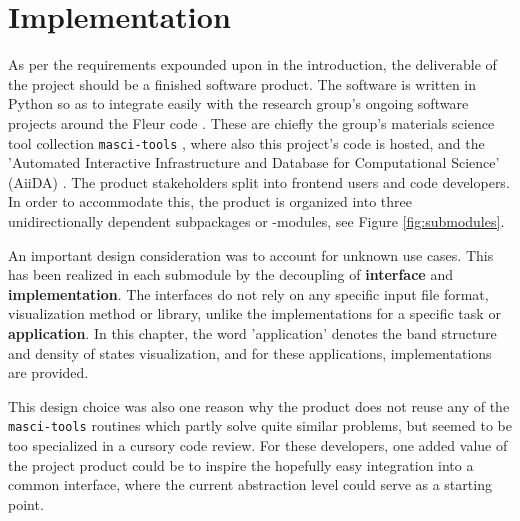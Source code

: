 
\chapter{Implementation}
\label{chap:implementation}


As per the requirements expounded upon in the introduction, the deliverable of
the project should be a finished software product. The software is written in
Python so as to integrate easily with the research group's ongoing software
projects around the Fleur code \cite{fleur}. These are chiefly the group's
materials science tool collection \texttt{masci-tools} \cite{masci-tools} ,
where also this project's code is hosted, and the 'Automated Interactive
Infrastructure and Database for Computational Science' (AiiDA) \cite{aiida}. The
product stakeholders split into frontend users and code developers. In order to
accommodate this, the product is organized into three unidirectionally dependent
subpackages or -modules, see Figure \ref{fig:submodules}.

An important design consideration was to account for unknown use cases. This has
been realized in each submodule by the decoupling of \textbf{interface} and
\textbf{implementation}. The interfaces do not rely on any specific input file
format, visualization method or library, unlike the implementations for a
specific task or \textbf{application}. In this chapter, the word 'application'
denotes the band structure and density of states visualization, and for these
applications, implementations are provided.

This design choice was also one reason why the product does not reuse any of the
\texttt{masci-tools} routines which partly solve quite similar problems, but
seemed to be too specialized in a cursory code review. For these developers,
one added value of the project product could be to inspire the hopefully easy
integration into a common interface, where the current abstraction level could
serve as a starting point.



